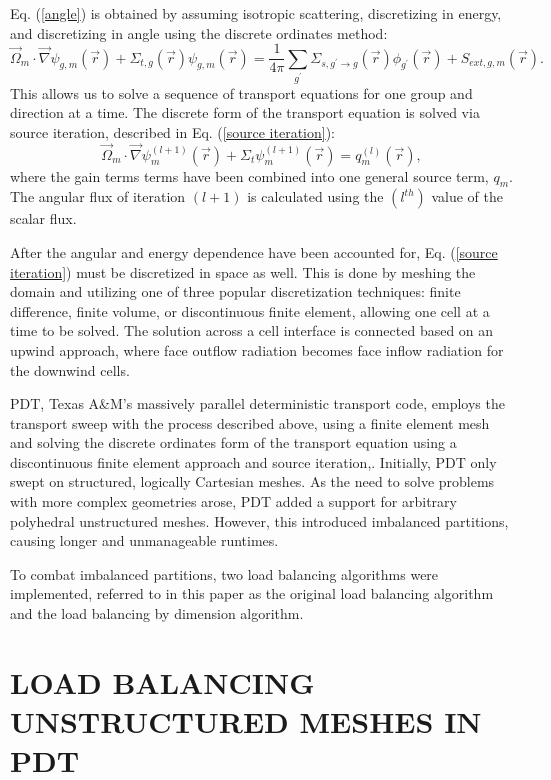 \documentclass[letterpaper]{mandc2019}
\newcommand{\vr}{\vec{r}}
\newcommand{\vo}{\vec{\Omega}}
\begin{document}
Eq. (\ref{angle}) is obtained by assuming isotropic scattering, discretizing in energy, and discretizing in angle using the discrete ordinates method:
\begin{equation}
\vo_m \cdot \vec \nabla \psi_{g,m}(\vr) +\Sigma_{t,g}(\vr) \psi_{g,m}(\vr)  = \frac{1}{4\pi}\sum_{g^{\prime}}\Sigma_{s,g^{\prime}\to g}(\vr)\phi_{g^{\prime}}(\vr) + S_{ext,g,m}(\vr).
\label{angle}
\end{equation}
This allows us to solve a sequence of transport equations for one group and direction at a time. The discrete form of the transport equation is solved via source iteration, described in Eq. (\ref{source iteration}):
\begin{equation}
\vo_m \cdot \vec\nabla \psi_m^{(l+1)}(\vr) + \Sigma_t \psi_m^{(l+1)}(\vr) = q_m^{(l)}(\vr),
\label{source iteration}
\end{equation}
where the gain terms terms have been combined into one general source term, $q_m$. The angular flux of iteration $(l+1)$ is calculated using the $(l^{th})$ value of the scalar flux. 

After the angular and energy dependence have been accounted for, Eq. (\ref{source iteration}) must be discretized in space as well. This is done by meshing the domain and utilizing one of three popular discretization techniques: finite difference\cite{fd}, finite volume\cite{fd}, or discontinuous finite element\cite{Reed}, allowing one cell at a time to be solved. The solution across a cell interface is connected based on an upwind approach, where face outflow radiation becomes face inflow radiation for the downwind cells. 

PDT, Texas A\&M's massively parallel deterministic transport code, employs the transport sweep with the process described above, using a finite element mesh and solving the discrete ordinates form of the transport equation using a discontinuous finite element approach and source iteration\cite{mpadams2015},\cite{mpadams2013}. Initially, PDT only swept on structured, logically Cartesian meshes. As the need to solve problems with more complex geometries arose, PDT added a support for arbitrary polyhedral unstructured meshes. However, this introduced imbalanced partitions, causing longer and unmanageable runtimes.

To combat imbalanced partitions, two load balancing algorithms were implemented, referred to in this paper as the original load balancing algorithm and the load balancing by dimension algorithm.

\section{LOAD BALANCING UNSTRUCTURED MESHES IN PDT} 
\label{sec:first}
\end{document}
